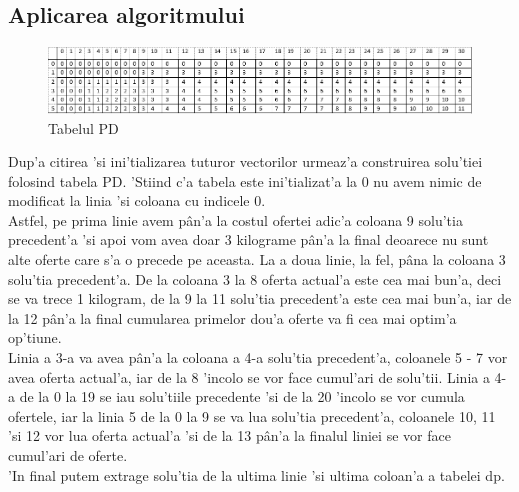 \subsection{Aplicarea algoritmului}
\begin{figure}[H]
\centering
\includegraphics[scale = 0.7]{Programare Dinamica/Tabel}
\caption{Tabelul PD}
\end{figure}
\vspace{10mm}
\myindent
Dup'a citirea 'si ini'tializarea tuturor vectorilor urmeaz'a construirea solu'tiei folosind tabela PD. 'Stiind c'a tabela este ini'tializat'a la 0 nu avem nimic de modificat la linia 'si coloana cu indicele 0.\\
\newline
\myindent
Astfel, pe prima linie avem p\^an'a la costul ofertei adic'a coloana 9 solu'tia precedent'a 'si apoi vom avea doar 3 kilograme p\^an'a la final deoarece nu sunt alte oferte care s'a o precede pe aceasta. La a doua linie, la fel, p\^ana la coloana 3 solu'tia precedent'a. De la coloana 3 la 8 oferta actual'a este cea mai bun'a, deci se va trece 1 kilogram, de la 9 la 11 solu'tia precedent'a este cea mai bun'a, iar de la 12 p\^an'a la final cumularea primelor dou'a oferte va fi cea mai optim'a op'tiune.\\
\newline
\myindent
Linia a 3-a va avea p\^an'a la coloana a 4-a solu'tia precedent'a, coloanele 5 - 7 vor avea oferta actual'a, iar de la 8 'incolo se vor face cumul'ari de solu'tii. Linia a 4-a de la 0 la 19 se iau solu'tiile precedente 'si de la 20 'incolo se vor cumula ofertele, iar la linia 5 de la 0 la 9 se va lua solu'tia precedent'a, coloanele 10, 11 'si 12 vor lua oferta actual'a 'si de la 13 p\^an'a la finalul liniei se vor face cumul'ari de oferte.\\
\newline
\myindent
'In final putem extrage solu'tia de la ultima linie 'si ultima coloan'a a tabelei dp.